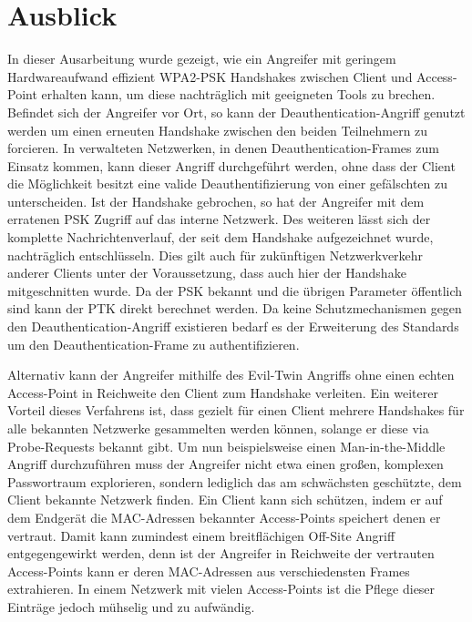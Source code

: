 \section{Ausblick}
In dieser Ausarbeitung wurde gezeigt, wie ein Angreifer mit geringem Hardwareaufwand effizient WPA2-PSK Handshakes zwischen Client und Access-Point erhalten kann, um diese nachträglich mit geeigneten Tools zu brechen.
Befindet sich der Angreifer vor Ort, so kann der Deauthentication-Angriff genutzt werden um einen erneuten Handshake zwischen den beiden Teilnehmern zu forcieren.
In verwalteten Netzwerken, in denen Deauthentication-Frames zum Einsatz kommen, kann dieser Angriff durchgeführt werden, ohne dass der Client die Möglichkeit besitzt eine valide Deauthentifizierung von einer gefälschten zu unterscheiden.
Ist der Handshake gebrochen, so hat der Angreifer mit dem erratenen PSK Zugriff auf das interne Netzwerk. 
Des weiteren lässt sich der komplette Nachrichtenverlauf, der seit dem Handshake aufgezeichnet wurde, nachträglich entschlüsseln.
Dies gilt auch für zukünftigen Netzwerkverkehr anderer Clients unter der Voraussetzung, dass auch hier der Handshake mitgeschnitten wurde.
Da der PSK bekannt und die übrigen Parameter öffentlich sind kann der PTK direkt berechnet werden.
Da keine Schutzmechanismen gegen den Deauthentication-Angriff existieren bedarf es der Erweiterung des Standards um den Deauthentication-Frame zu authentifizieren. %

Alternativ kann der Angreifer mithilfe des Evil-Twin Angriffs ohne einen echten Access-Point in Reichweite den Client zum Handshake verleiten.
Ein weiterer Vorteil dieses Verfahrens ist, dass gezielt für einen Client mehrere Handshakes für alle bekannten Netzwerke gesammelten werden können, solange er diese via Probe-Requests bekannt gibt.
Um nun beispielsweise einen Man-in-the-Middle Angriff durchzuführen muss der Angreifer nicht etwa einen großen, komplexen Passwortraum explorieren, sondern lediglich das am schwächsten geschützte, dem Client bekannte Netzwerk finden.
Ein Client kann sich schützen, indem er auf dem Endgerät die MAC-Adressen bekannter Access-Points speichert denen er vertraut. 
Damit kann zumindest einem breitflächigen Off-Site Angriff entgegengewirkt werden, denn ist der Angreifer in Reichweite der vertrauten Access-Points kann er deren MAC-Adressen aus verschiedensten Frames extrahieren.
In einem Netzwerk mit vielen Access-Points ist die Pflege dieser Einträge jedoch mühselig und zu aufwändig.

